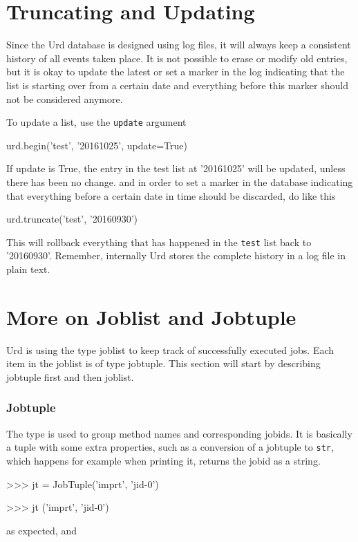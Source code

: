 \section{Truncating and Updating}

Since the Urd database is designed using log files, it will always
keep a consistent history of all events taken place.  It is not
possible to erase or modify old entries, but it is okay to update the
latest or set a marker in the log indicating that the list is starting
over from a certain date and everything before this marker should not
be considered anymore.

To update a list, use the \texttt{update} argument
\begin{python}
urd.begin('test', '20161025', update=True)
\end{python}
If update is True, the entry in the test list at '20161025' will be
updated, unless there has been no change.  and in order to set a
marker in the database indicating that everything before a certain
date in time should be discarded, do like this
\begin{python}
urd.truncate('test', '20160930')
\end{python}
This will rollback everything that has happened in the \texttt{test}
list back to '20160930'.  Remember, internally Urd stores the complete
history in a log file in plain text.


\section{More on Joblist and Jobtuple}

Urd is using the type joblist to keep track of successfully executed
jobs.  Each item in the joblist is of type jobtuple.  This section
will start by describing jobtuple first and then joblist.

\subsubsection{Jobtuple}

The \jobtuple type is used to group method names and corresponding
jobids.  It is basically a tuple with some extra properties, such as a
conversion of a jobtuple to \texttt{str}, which happens for example
when printing it, returns the jobid as a string.

\begin{pythonBEG}
>>> jt = JobTuple('imprt', 'jid-0')

>>> jt
('imprt', 'jid-0')
\end{pythonBEG}
as expected, and

